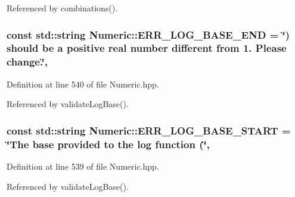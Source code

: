 Referenced by combinations().

\hypertarget{classmultiscale_1_1Numeric_a291c98ea0c6e6c4042fe9ecc4af0443a}{
\subsubsection[{E\-R\-R\-\_\-\-L\-O\-G\-\_\-\-B\-A\-S\-E\-\_\-\-E\-N\-D}]{\setlength{\rightskip}{0pt plus 5cm}const std\-::string Numeric\-::\-E\-R\-R\-\_\-\-L\-O\-G\-\_\-\-B\-A\-S\-E\-\_\-\-E\-N\-D = \char`\"{}) should be a positive real number different from 1. Please change.\char`\"{}\hspace{0.3cm}{\ttfamily [static]}, {\ttfamily [private]}}}\label{classmultiscale_1_1Numeric_a291c98ea0c6e6c4042fe9ecc4af0443a}


Definition at line 540 of file Numeric.\-hpp.



Referenced by validate\-Log\-Base().

\hypertarget{classmultiscale_1_1Numeric_a551052e6be615efea82ea046ba178010}{
\subsubsection[{E\-R\-R\-\_\-\-L\-O\-G\-\_\-\-B\-A\-S\-E\-\_\-\-S\-T\-A\-R\-T}]{\setlength{\rightskip}{0pt plus 5cm}const std\-::string Numeric\-::\-E\-R\-R\-\_\-\-L\-O\-G\-\_\-\-B\-A\-S\-E\-\_\-\-S\-T\-A\-R\-T = \char`\"{}The base provided to the {\bf log} function (\char`\"{}\hspace{0.3cm}{\ttfamily [static]}, {\ttfamily [private]}}}\label{classmultiscale_1_1Numeric_a551052e6be615efea82ea046ba178010}


Definition at line 539 of file Numeric.\-hpp.



Referenced by validate\-Log\-Base().

